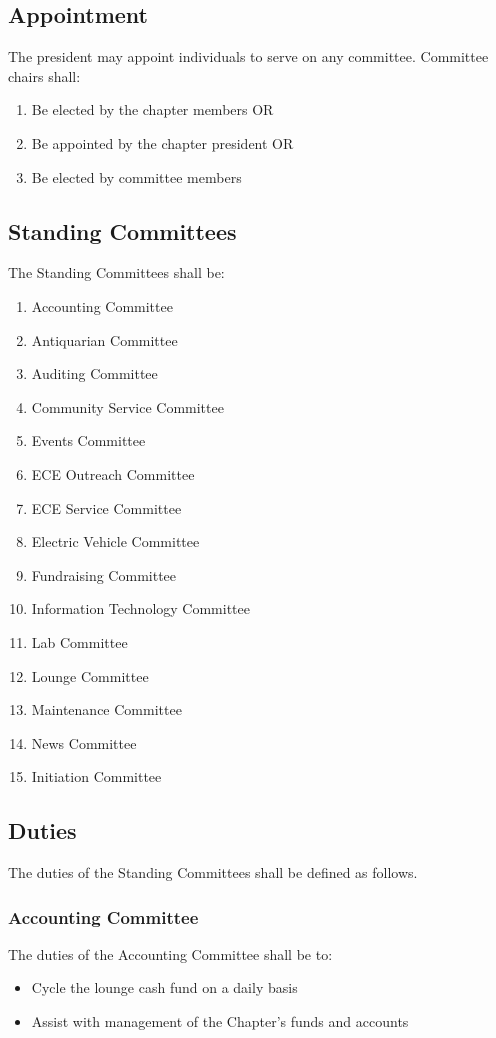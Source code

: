 \documentclass[10pt, oneside]{article}
\begin{document}
\subsection{Appointment}
The president may appoint individuals to serve on any committee. Committee chairs shall:
\begin{enumerate}[label=\alph*.]
\item Be elected by the chapter members OR
\item Be appointed by the chapter president OR
\item Be elected by committee members
\end{enumerate}
\subsection{Standing Committees}
The Standing Committees shall be:
\begin{enumerate}[label=\alph*.]
\item Accounting Committee
\item Antiquarian Committee
\item Auditing Committee
\item Community Service Committee
\item Events Committee
\item ECE Outreach Committee
\item ECE Service Committee
\item Electric Vehicle Committee
\item Fundraising Committee
\item Information Technology Committee
\item Lab Committee
\item Lounge Committee
\item Maintenance Committee
\item News Committee
\item Initiation Committee
\end{enumerate}
\subsection{Duties}
The duties of the Standing Committees shall be defined as follows.
\subsubsection{Accounting Committee}
The duties of the Accounting Committee shall be to:
\begin{itemize}
\item Cycle the lounge cash fund on a daily basis
\item Assist with management of the Chapter’s funds and accounts
\end{itemize}
\end{document}
